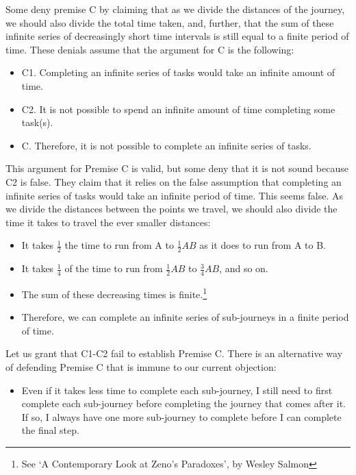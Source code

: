 \documentclass[]{article}
\begin{document}
Some deny premise C by claiming that as we divide the distances of the
journey, we should also divide the total time taken, and, further, that
the sum of these infinite series of decreasingly short time intervals is
still equal to a finite period of time. These denials assume that the
argument for C is the following:

\begin{itemize}
\item
  C1. Completing an infinite series of tasks would take an infinite
  amount of time.
\item
  C2. It is not possible to spend an infinite amount of time completing
  some task(s).
\item
  C. Therefore, it is not possible to complete an infinite series of
  tasks.
\end{itemize}

This argument for Premise C is valid, but some deny that it is not sound
because C2 is false. They claim that it relies on the false assumption
that completing an infinite series of tasks would take an infinite
period of time. This seems false. As we divide the distances between the
points we travel, we should also divide the time it takes to travel the
ever smaller distances:

\begin{itemize}
\item
  It takes \(\frac{1}{2}\) the time to run from A to \(\frac{1}{2}AB\)
  as it does to run from A to B.
\item
  It takes \(\frac{1}{4}\) of the time to run from \(\frac{1}{2}AB\) to
  \(\frac{3}{4}AB\), and so on.
\item
  The sum of these decreasing times is finite.\footnote{See `A
    Contemporary Look at Zeno's Paradoxes', by Wesley Salmon}
\item
  Therefore, we can complete an infinite series of sub-journeys in a
  finite period of time.
\end{itemize}

Let us grant that C1-C2 fail to establish Premise C. There is an
alternative way of defending Premise C that is immune to our current
objection:

\begin{itemize}
\itemsep1pt\parskip0pt
\item
  Even if it takes less time to complete each sub-journey, I still need
  to first complete each sub-journey before completing the journey that
  comes after it. If so, I always have one more sub-journey to complete
  before I can complete the final step.
\end{itemize}
\end{document}
